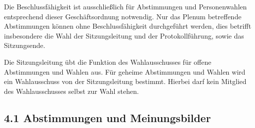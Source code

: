 \documentclass[12pt,oneside]{scrartcl}
\begin{document}
Die Beschlussfähigkeit ist ausschließlich für Abstimmungen und Personenwahlen
entsprechend dieser Geschäftsordnung notwendig.
Nur das Plenum betreffende Abstimmungen können ohne Beschlussfähigkeit
durchgeführt werden, dies betrifft insbesondere die Wahl der Sitzungsleitung und der
Protokollführung, sowie das Sitzungsende.

Die Sitzungsleitung übt die Funktion des Wahlausschusses für offene Abstimmungen und
Wahlen aus. Für geheime Abstimmungen und Wahlen wird ein Wahlausschuss von der
Sitzungsleitung bestimmt. Hierbei darf kein Mitglied des Wahlausschusses selbst zur
Wahl stehen.


\subsection{4.1 Abstimmungen und Meinungsbilder%
  \label{abstimmungen-und-meinungsbilder}%
}
\end{document}
